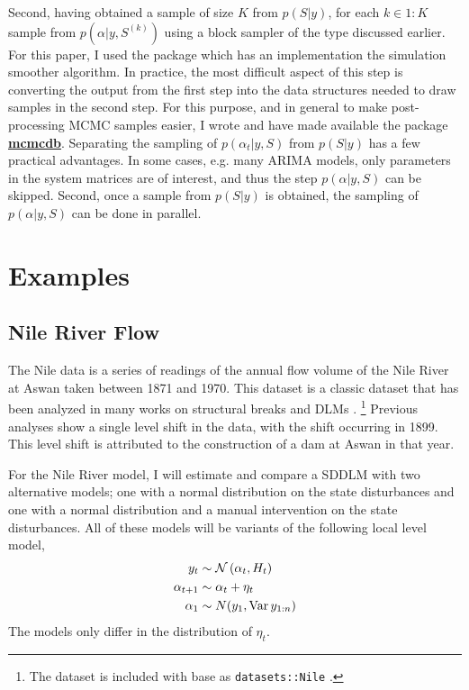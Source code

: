 \documentclass{article}
\begin{document}
Second, having obtained a sample of size $K$ from $p(S | y)$, for each $k \in 1:K$ sample from $p(\alpha | y, S^{(k)})$ using a block sampler of the type discussed earlier.
For this paper, I used the \RLang{} package  \parencite{Helske2012} which has an implementation the \textcite{DurbinKoopman2002} simulation smoother algorithm.
In practice, the most difficult aspect of this step is converting the output from the first step into the data structures needed to draw samples in the second step.
For this purpose, and in general to make post-processing MCMC samples easier, I wrote and have made available the \RLang{} package \href{https://github.com/jrnold/mcmcdb}{\textbf{mcmcdb}}.
Separating the sampling of $p(\alpha_{t} | y, S)$ from $p(S | y)$ has a few practical advantages.
In some cases, e.g. many ARIMA models, only parameters in the system matrices are of interest, and thus the step $p(\alpha | y, S)$ can be skipped.
Second, once a sample from $p(S | y)$ is obtained, the sampling of $p(\alpha | y, S)$ can be done in parallel.

\section{Examples}
\label{sec:examples}

\subsection{Nile River Flow}
\label{sec:nile}

The Nile data is a series of readings of the annual flow volume of the Nile River at Aswan taken between 1871 and 1970.
This dataset is a classic dataset that has been analyzed in many works on structural breaks and DLMs \parencites{Cobb1978}{Balke1993}{JongPenzer1998}{DurbinKoopman2001}{CommandeurKoopmanOoms2011}.%
\footnote{The dataset is included with base \RLang{} as \texttt{datasets::Nile} \parencite{RCT2013}.}
Previous analyses show a single level shift in the data, with the shift occurring in 1899.
This level shift is attributed to the construction of a dam at Aswan in that year.

For the Nile River model, I will estimate and compare a SDDLM with two alternative models; one with a normal distribution on the state disturbances and one with a normal distribution and a manual intervention on the state disturbances.
All of these models will be variants of the following local level model,
\begin{equation}
  \label{eq:21}
  \begin{aligned}[t]
    y_{t} &\sim \mathcal{N}\left(\alpha_{t}, H_{t}\right) \\
    \alpha_{t + 1} &\sim \alpha_{t} + \eta_{t} \\
    \alpha_{1} &\sim N(y_{1}, \operatorname{Var} y_{1:n})
  \end{aligned}
\end{equation}
The models only differ in the distribution of $\eta_{t}$.
\end{document}
